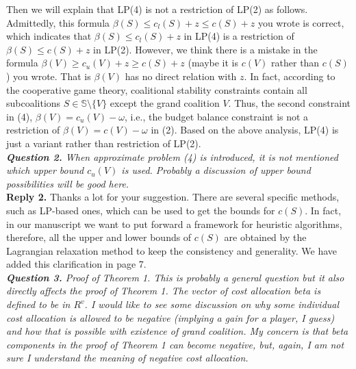 \documentclass[11pt]{article}
\begin{document}
Then we will explain that LP(4) is not a restriction of LP(2) as follows.
Admittedly, this formula $\beta(S) \leq c_l(S) + z \leq c(S) + z$ you wrote is correct, which indicates that $\beta(S) \leq c_l(S) + z$ in LP(4) is a restriction of $\beta(S) \leq c(S) + z$ in LP(2).
However, we think there is a mistake in the formula $\beta(V) \geq c_u(V) + z \geq c(S) + z$ (maybe it is $c(V)$ rather than $c(S)$) you wrote. That is $\beta(V)$ has no direct relation with $z$.
In fact, according to the cooperative game theory, coalitional stability constraints contain all subcoalitions $S \in \mathbb{S} \setminus \big\{V\big\}$ except the grand coalition $V$.
Thus, the second constraint in (4), $\beta(V)=c_u(V)-\omega$, i.e., the budget balance constraint is not a restriction of $\beta(V)=c(V)-\omega$ in (2).
Based on the above analysis, LP(4) is just a variant rather than restriction of LP(2).
\\[4mm]
%
%
%
\noindent \textit{\textbf{Question 2.}
When approximate problem (4) is introduced, it is not mentioned which upper bound $c_u(V)$ is used. Probably a discussion of upper bound possibilities will be good here.}
\\[2mm]
\noindent \textbf{Reply 2.}
Thanks a lot for your suggestion. There are several specific methods, such as LP-based ones, which can be used to get the bounds for $c(S)$.
In fact, in our manuscript we want to put forward a framework for heuristic algorithms, therefore, all the upper and lower bounds of $c(S)$ are obtained by the Lagrangian relaxation method to keep the consistency and generality. We have added this clarification in page 7.
~\\[4mm]
%
%
%
\noindent \textit{\textbf{Question 3.}
Proof of Theorem 1. This is probably a general question but it also directly affects the proof of Theorem 1. The vector of cost allocation beta is defined to be in $R^v$.
I would like to see some discussion on why some individual cost allocation is allowed to be negative (implying a gain for a player, I guess) and how that is possible with existence of grand coalition. My concern is that beta components in the proof of Theorem 1 can become negative, but, again, I am not sure I understand the meaning of negative cost allocation.}
\end{document}
